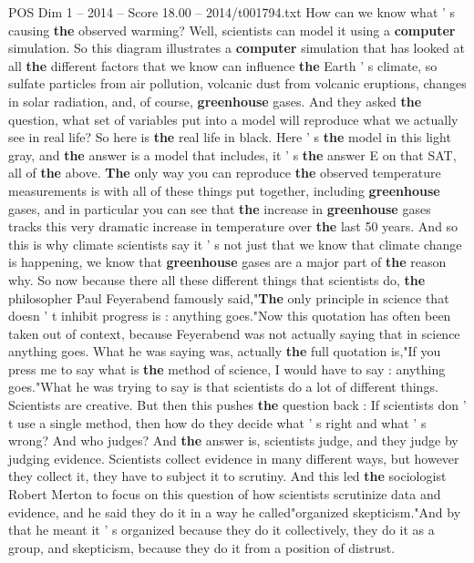 \begin{textsample}{POS Dim 1 – 2014 – Score 18.00 – 2014/t001794.txt}
How can we know what ' s causing \textbf{the} observed warming?
Well, scientists can model it using a \textbf{computer} simulation.
So this diagram illustrates a \textbf{computer} simulation that has looked at all \textbf{the} different factors that we know can influence \textbf{the} Earth ' s climate, so sulfate particles from air pollution, volcanic dust from volcanic eruptions, changes in solar radiation, and, of course, \textbf{greenhouse} gases.
And they asked \textbf{the} question, what set of variables put into a model will reproduce what we actually see in real life?
So here is \textbf{the} real life in black.
Here ' s \textbf{the} model in this light gray, and \textbf{the} answer is a model that includes, it ' s \textbf{the} answer E on that SAT, all of \textbf{the} above. \textbf{The} only way you can reproduce \textbf{the} observed temperature measurements is with all of these things put together, including \textbf{greenhouse} gases, and in particular you can see that \textbf{the} increase in \textbf{greenhouse} gases tracks this very dramatic increase in temperature over \textbf{the} last 50 years.
And so this is why climate scientists say it ' s not just that we know that climate change is happening, we know that \textbf{greenhouse} gases are a major part of \textbf{the} reason why.
So now because there all these different things that scientists do, \textbf{the} philosopher Paul Feyerabend famously said,"\textbf{The} only principle in science that doesn ' t inhibit progress is : anything goes."Now this quotation has often been taken out of context, because Feyerabend was not actually saying that in science anything goes.
What he was saying was, actually \textbf{the} full quotation is,"If you press me to say what is \textbf{the} method of science, I would have to say : anything goes."What he was trying to say is that scientists do a lot of different things.
Scientists are creative.
But then this pushes \textbf{the} question back : If scientists don ' t use a single method, then how do they decide what ' s right and what ' s wrong?
And who judges?
And \textbf{the} answer is, scientists judge, and they judge by judging evidence.
Scientists collect evidence in many different ways, but however they collect it, they have to subject it to scrutiny.
And this led \textbf{the} sociologist Robert Merton to focus on this question of how scientists scrutinize data and evidence, and he said they do it in a way he called"organized skepticism."And by that he meant it ' s organized because they do it collectively, they do it as a group, and skepticism, because they do it from a position of distrust.

\end{textsample}
